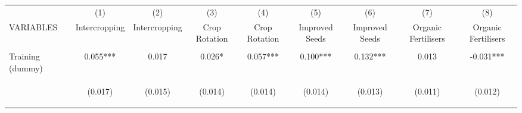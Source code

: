 \begin{center}
\begin{tabular}{lcccccccc} \hline
 & (1) & (2) & (3) & (4) & (5) & (6) & (7) & (8) \\
VARIABLES & Intercropping & Intercropping & Crop Rotation & Crop Rotation & Improved Seeds & Improved Seeds & Organic Fertilisers & Organic Fertilisers \\ \hline
\vspace{4pt} & \begin{footnotesize}\end{footnotesize} & \begin{footnotesize}\end{footnotesize} & \begin{footnotesize}\end{footnotesize} & \begin{footnotesize}\end{footnotesize} & \begin{footnotesize}\end{footnotesize} & \begin{footnotesize}\end{footnotesize} & \begin{footnotesize}\end{footnotesize} & \begin{footnotesize}\end{footnotesize} \\
Training (dummy) & 0.055*** & 0.017 & 0.026* & 0.057*** & 0.100*** & 0.132*** & 0.013 & -0.031*** \\
\vspace{4pt} & \begin{footnotesize}(0.017)\end{footnotesize} & \begin{footnotesize}(0.015)\end{footnotesize} & \begin{footnotesize}(0.014)\end{footnotesize} & \begin{footnotesize}(0.014)\end{footnotesize} & \begin{footnotesize}(0.014)\end{footnotesize} & \begin{footnotesize}(0.013)\end{footnotesize} & \begin{footnotesize}(0.011)\end{footnotesize} & \begin{footnotesize}(0.012)\end{footnotesize} \\

\end{tabular}
\end{center}
